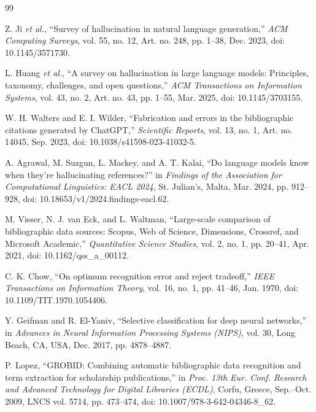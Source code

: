 \renewcommand\bibname{TÀI LIỆU THAM KHẢO}
\clearpage
{}
\addcontentsline{toc}{chapter}{\bibname}
\begin{thebibliography}{99}

Z. Ji \textit{et al.}, ``Survey of hallucination in natural language generation,'' \textit{ACM Computing Surveys}, vol. 55, no. 12, Art. no. 248, pp. 1--38, Dec. 2023, doi: 10.1145/3571730.

L. Huang \textit{et al.}, ``A survey on hallucination in large language models: Principles, taxonomy, challenges, and open questions,'' \textit{ACM Transactions on Information Systems}, vol. 43, no. 2, Art. no. 43, pp. 1--55, Mar. 2025, doi: 10.1145/3703155.

W. H. Walters and E. I. Wilder, ``Fabrication and errors in the bibliographic citations generated by ChatGPT,'' \textit{Scientific Reports}, vol. 13, no. 1, Art. no. 14045, Sep. 2023, doi: 10.1038/s41598-023-41032-5.

A. Agrawal, M. Suzgun, L. Mackey, and A. T. Kalai, ``Do language models know when they're hallucinating references?'' in \textit{Findings of the Association for Computational Linguistics: EACL 2024}, St. Julian's, Malta, Mar. 2024, pp. 912--928, doi: 10.18653/v1/2024.findings-eacl.62.

M. Visser, N. J. van Eck, and L. Waltman, ``Large-scale comparison of bibliographic data sources: Scopus, Web of Science, Dimensions, Crossref, and Microsoft Academic,'' \textit{Quantitative Science Studies}, vol. 2, no. 1, pp. 20--41, Apr. 2021, doi: 10.1162/qss\_a\_00112.

C. K. Chow, ``On optimum recognition error and reject tradeoff,'' \textit{IEEE Transactions on Information Theory}, vol. 16, no. 1, pp. 41--46, Jan. 1970, doi: 10.1109/TIT.1970.1054406.

Y. Geifman and R. El-Yaniv, ``Selective classification for deep neural networks,'' in \textit{Advances in Neural Information Processing Systems (NIPS)}, vol. 30, Long Beach, CA, USA, Dec. 2017, pp. 4878--4887.

P. Lopez, ``GROBID: Combining automatic bibliographic data recognition and term extraction for scholarship publications,'' in \textit{Proc. 13th Eur. Conf. Research and Advanced Technology for Digital Libraries (ECDL)}, Corfu, Greece, Sep.--Oct. 2009, LNCS vol. 5714, pp. 473--474, doi: 10.1007/978-3-642-04346-8\_62.


\end{thebibliography}
